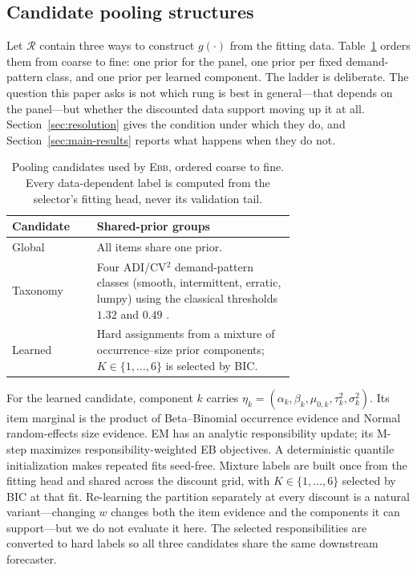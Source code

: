 \documentclass[twoside]{article}
\theoremstyle{definition}
\newcommand{\EBB}{\textsc{Ebb}}
\begin{document}
\subsection{Candidate pooling structures}\label{sec:mixture}

Let $\mathcal R$ contain three ways to construct $g(\cdot)$ from the
fitting data. Table~\ref{tab:pool-candidates} orders them from coarse to
fine: one prior for the panel, one prior per fixed demand-pattern class,
and one prior per learned component. The ladder is deliberate. The
question this paper asks is not which rung is best in general---that
depends on the panel---but whether the discounted data support moving up
it at all. Section~\ref{sec:resolution} gives the condition under which
they do, and Section~\ref{sec:main-results} reports what happens when they
do not.

\begin{table}[t]
\centering
\caption{Pooling candidates used by \EBB{}, ordered coarse to fine.
Every data-dependent label is computed from the selector's fitting head,
never its validation tail.}
\label{tab:pool-candidates}
\small
\setlength{\tabcolsep}{3.5pt}
\begin{tabular}{lp{0.70\linewidth}}
\toprule
Candidate & Shared-prior groups\\
\midrule
Global & All items share one prior.\\
Taxonomy & Four ADI/CV$^2$ demand-pattern classes (smooth, intermittent,
erratic, lumpy) using the classical thresholds $1.32$ and $0.49$
\citep{syntetos2005categorization}.\\
Learned & Hard assignments from a mixture of occurrence--size prior
components; $K\in\{1,\ldots,6\}$ is selected by BIC.\\
\bottomrule
\end{tabular}
\end{table}

For the learned candidate, component $k$ carries
$\eta_k=(\alpha_k,\beta_k,\mu_{0,k},\tau_k^2,\sigma_k^2)$. Its item
marginal is the product of Beta--Binomial occurrence evidence and Normal
random-effects size evidence. EM has an analytic responsibility update;
its M-step maximizes responsibility-weighted EB objectives. A
deterministic quantile initialization makes repeated fits seed-free.
Mixture labels are built once from the fitting head and shared across the
discount grid, with $K\in\{1,\dots,6\}$ selected by BIC at that fit.
Re-learning the partition separately at every discount is a natural
variant---changing $w$ changes both the item evidence and the components
it can support---but we do not evaluate it here. The
selected responsibilities are converted to hard labels so all three
candidates share the same downstream forecaster.
\end{document}
